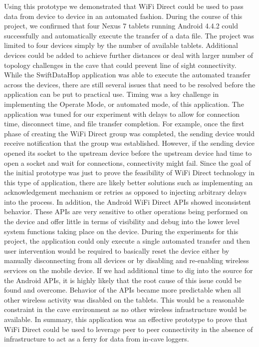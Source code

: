 \documentclass[10pt,twocolumn]{article}
\begin{document}
Using this prototype we demonstrated that WiFi Direct could be used to pass data from device to device in an automated fashion. 
During the course of this project, we confirmed that four Nexus 7 tablets running Android 4.4.2 could successfully and automatically execute the transfer of a data file.
The project was limited to four devices simply by the number of available tablets.
Additional devices could be added to achieve further distances or deal with larger number of topology challenges in the cave that could prevent line of sight connectivity. 
While the SwiftDataHop application was able to execute the automated transfer across the devices, there are still several issues that need to be resolved before the application can be put to practical use.
Timing was a key challenge in implementing the Operate Mode, or automated mode, of this application.
The application was tuned for our experiment with delays to allow for connection time, disconnect time, and file transfer completion.
For example, once the first phase of creating the WiFi Direct group was completed, the sending device would receive notification that the group was established.  
However, if the sending device opened its socket to the upstream device before the upstream device had time to open a socket and wait for connections, connectivity might fail.
Since the goal of the initial prototype was just to prove the feasibility of WiFi Direct technology in this type of application, there are likely better solutions such as implementing an acknowledgement mechanism or retries as opposed to injecting arbitrary delays into the process. 
In addition, the Android WiFi Direct APIs showed inconsistent behavior.
These APIs are very sensitive to other operations being performed on the device and offer little in terms of visibility and debug into the lower level system functions taking place on the device.
During the experiments for this project, the application could only execute a single automated transfer and then user intervention would be required to basically reset the device either by manually disconnecting from all devices or by disabling and re-enabling wireless services on the mobile device.
If we had additional time to dig into the source for the Android APIs, it is highly likely that the root cause of this issue could be found and overcome.
Behavior of the APIs became more predictable when all other wireless activity was disabled on the tablets.
This would be a reasonable constraint in the cave environment as no other wireless infrastructure would be available.
In summary, this application was an effective prototype to prove that WiFi Direct could be used to leverage peer to peer connectivity in the absence of infrastructure to act as a ferry for data from in-cave loggers.
\end{document}
